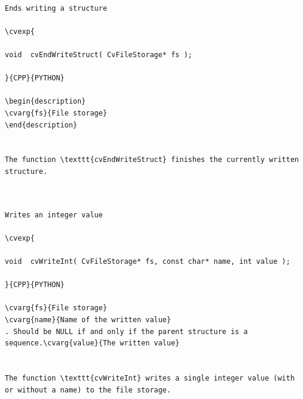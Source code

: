 \label{EndWriteStruct}
\begin{verbatim}

Ends writing a structure

\cvexp{

void  cvEndWriteStruct( CvFileStorage* fs );

}{CPP}{PYTHON}

\begin{description}
\cvarg{fs}{File storage}
\end{description}


The function \texttt{cvEndWriteStruct} finishes the currently written structure.


\end{verbatim}
\label{WriteInt}
\begin{verbatim}

Writes an integer value

\cvexp{

void  cvWriteInt( CvFileStorage* fs, const char* name, int value );

}{CPP}{PYTHON}

\cvarg{fs}{File storage}
\cvarg{name}{Name of the written value}
. Should be NULL if and only if the parent structure is a sequence.\cvarg{value}{The written value}


The function \texttt{cvWriteInt} writes a single integer value (with or without a name) to the file storage.


\end{verbatim}
\label{WriteReal}
